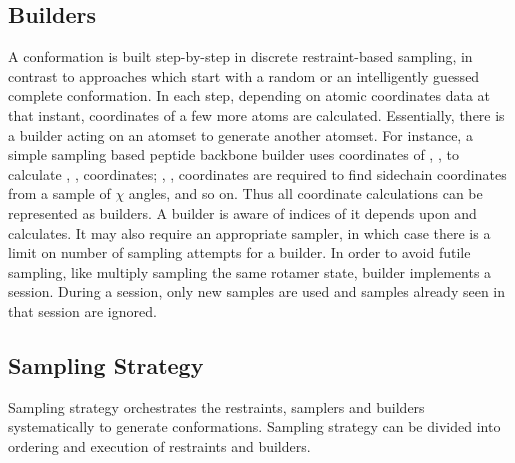 \documentclass{article}[14pts]
\begin{document}
\subsection{Builders}
A conformation is built step-by-step in discrete restraint-based sampling, in contrast to approaches which start with a random or an intelligently guessed complete conformation. In each step, depending on atomic coordinates data at that instant, coordinates of a few more atoms are calculated. Essentially, there is a builder acting on an atomset to generate another atomset. For instance, a simple \phipsi sampling based peptide backbone builder uses coordinates of , ,  to calculate , ,  coordinates; , ,  coordinates are required to find sidechain coordinates from a sample of $\chi$ angles, and so on. Thus all coordinate calculations can be represented as builders. A builder is aware of indices of it depends upon and calculates. It may also require an appropriate sampler, in which case there is a limit on number of sampling attempts for a builder. In order to avoid futile sampling, like multiply sampling the same rotamer state, builder implements a session. During a session, only new samples are used and samples already seen in that session are ignored.

\subsection{Sampling Strategy}
Sampling strategy orchestrates the restraints, samplers and builders systematically to generate conformations. Sampling strategy can be divided into ordering and execution of restraints and builders.
\end{document}
